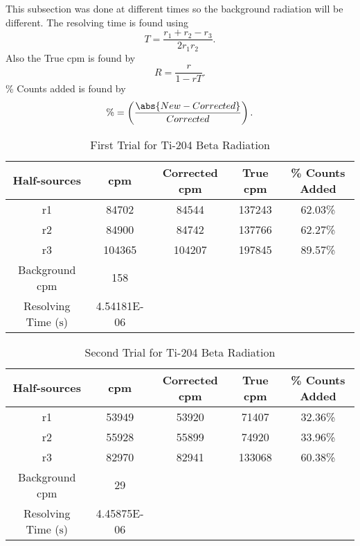\documentclass[11pt]{article}
\begin{document}
	This subsection was done at different times so the background radiation will be different. The resolving time is found using
	\[
		T = \frac{r_1 + r_2 - r_3}{2r_1 r_2}.
	\]
	Also the True cpm is found by
	\[
		R = \frac{r}{1-rT}.
	\]
	\% Counts added is found by
	\[
		\% = \left( \frac{\abs{New - Corrected}}{Corrected} \right).
	\]
	\begin{table}[htbp]
		\centering
		\caption{First Trial for Ti-204 Beta Radiation}
		\begin{tabular}{ccccc}
			\toprule
			Half-sources & cpm & Corrected cpm & True cpm & \% Counts Added \\
			\midrule
			r1 & 84702 & 84544 & 137243 & 62.03\% \\
			r2 & 84900 & 84742 & 137766 & 62.27\% \\
			r3 & 104365 & 104207 & 197845 & 89.57\% \\
			\midrule
			Background cpm & 158 &   &   &  \\
			Resolving Time ($\unit{\second}$) & 4.54181E-06 &   &   &  \\
			\cmidrule{1-2}    \end{tabular}%
		\label{tab:4_Table_1}%
	\end{table}%
	
	\begin{table}[htbp]
		\centering
		\caption{Second Trial for Ti-204 Beta Radiation}
		\begin{tabular}{ccccc}
			\toprule
			Half-sources & cpm & Corrected cpm & True cpm & \% Counts Added \\
			\midrule
			r1 & 53949 & 53920 & 71407 & 32.36\% \\
			r2 & 55928 & 55899 & 74920 & 33.96\% \\
			r3 & 82970 & 82941 & 133068 & 60.38\% \\
			\midrule
			Background cpm & 29 &   &   &  \\
			Resolving Time ($\unit{\second}$) & 4.45875E-06 &   &   &  \\
			\cmidrule{1-2}    \end{tabular}%
		\label{tab:4_Table_2}%
	\end{table}%
	
\end{document}
